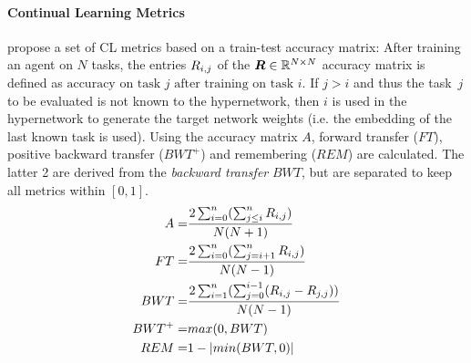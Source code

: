 \documentclass[dvipsnames]{article} %
\newcommand{\commentOLD}[1]{}
\newcommand{\psOLD}[1] {\commentOLD{{\color {purple} PS: #1}}}             %
\newcommand{\saOLD}[1] {\commentOLD{{\color{cyan} SA: #1}}}                %
\begin{document}
\paragraph{Continual Learning Metrics} \citet{moreThanForgetting} propose a set of CL metrics based on a train-test accuracy matrix: After training an agent on $N$ tasks, the entries  ${R}_{i,j}$ of the ${\bm{R}}\in \mathbb{R}^{N\times N}$ accuracy matrix is defined as $\text{accuracy on task }j\text{ after training on task }i$. If $j>i$ and thus the task~$j$ to be evaluated is not known to the hypernetwork, then $i$ is used in the hypernetwork to generate the target network weights (i.e. the embedding of the last known task is used). 
Using the accuracy matrix $A$, forward transfer ($FT$), positive backward transfer ($BWT^+$) and remembering ($REM$) are calculated. The latter 2 are derived from the \textit{backward transfer} $BWT$, but are separated to keep all metrics within $[0,1]$.
\begin{align}
    A =     & \frac{2\sum_{i=0}^n(\sum_{j\leq i}^n{R}_{i,j})}{N(N+1)} \label{eq:accuracy}\\
    FT =    & \frac{2\sum_{i=0}^n(\sum_{j=i+1}^n{R}_{i,j})}{N(N-1)} \label{eq:FT}\\
    BWT =   & \frac{2\sum_{i=1}^n(\sum_{j=0}^{i-1}({R}_{i,j}-{R}_{j,j}))}{N(N-1)} \label{eq:BTW}\\
    BWT^+ = & max(0, BWT) \label{eq:BWT+}\\
    REM =   & 1-|min(BWT,0)| \label{eq:REM}
\end{align}

\psOLD{Will not report the TFT metric, getting too long. \paragraph{Training Forward Transfer} The CL metrics based on the train-test accuracy matrix only represent the result at the end of an agent's training on a given task. To get insight into the agents' behavior during training time, we also report the forward transfer metric proposed by \citet{continualWorld}. This metric compares the areas under the curve (AUC) for the training curves of the CL method ($\text{AUC}^{cl}$) with a baseline method ($\text{AUC}^{ref}$) for each task $i$. Intuitively, positive forward transfer here indicates faster learning compared to the baseline, while negative forward transfer indicates slowdown and/or a lower final accuracy. To differentiate this metric from the forward transfer derived from the train-test accuracy matrix (Eq. \ref{eq:FT}), we will hereafter refer to it as "training forward transfer" (TFT).
\saOLD{Introduce an abbreviation for this, such as TFT.}
\begin{align}
    TFT = \frac{1}{n}\sum_{i=0}^n \frac{\text{AUC}_i^{cl}-\text{AUC}_i^{ref}}{1-\text{AUC}_i^{ref}} \label{eq:TFT}
\end{align}
}
\end{document}
